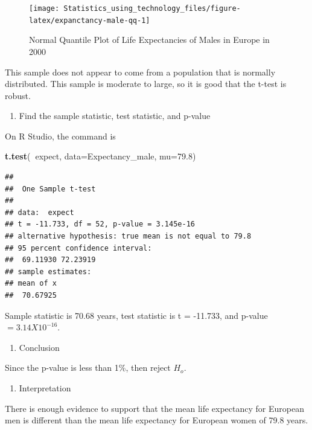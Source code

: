 \documentclass[
]{book}
\newenvironment{Shaded}{\begin{snugshade}}{\end{snugshade}}
\newcommand{\DataTypeTok}[1]{\textcolor[rgb]{0.13,0.29,0.53}{#1}}
\newcommand{\FloatTok}[1]{\textcolor[rgb]{0.00,0.00,0.81}{#1}}
\newcommand{\KeywordTok}[1]{\textcolor[rgb]{0.13,0.29,0.53}{\textbf{#1}}}
\newcommand{\NormalTok}[1]{#1}
\newcommand{\OperatorTok}[1]{\textcolor[rgb]{0.81,0.36,0.00}{\textbf{#1}}}
\providecommand{\tightlist}{%
  \setlength{\itemsep}{0pt}\setlength{\parskip}{0pt}}
\begin{document}
\begin{figure}
\texttt{[image: Statistics\_using\_technology\_files/figure-latex/expanctancy-male-qq-1]} \caption{Normal Quantile Plot of Life Expectancies of Males in Europe in 2000}\label{fig:expanctancy-male-qq}
\end{figure}

This sample does not appear to come from a population that is normally distributed. This sample is moderate to large, so it is good that the t-test is robust.

\begin{enumerate}
\def\labelenumi{\arabic{enumi}.}
\setcounter{enumi}{3}
\tightlist
\item
  Find the sample statistic, test statistic, and p-value
\end{enumerate}

On R Studio, the command is

\begin{Shaded}
\begin{Highlighting}[]
\KeywordTok{t.test}\NormalTok{(}\OperatorTok{~}\NormalTok{expect, }\DataTypeTok{data=}\NormalTok{Expectancy_male, }\DataTypeTok{mu=}\FloatTok{79.8}\NormalTok{)}
\end{Highlighting}
\end{Shaded}

\begin{verbatim}
## 
##  One Sample t-test
## 
## data:  expect
## t = -11.733, df = 52, p-value = 3.145e-16
## alternative hypothesis: true mean is not equal to 79.8
## 95 percent confidence interval:
##  69.11930 72.23919
## sample estimates:
## mean of x 
##  70.67925
\end{verbatim}

Sample statistic is 70.68 years, test statistic is t = -11.733, and p-value \(=3.14X10^{-16}\).

\begin{enumerate}
\def\labelenumi{\arabic{enumi}.}
\setcounter{enumi}{4}
\tightlist
\item
  Conclusion
\end{enumerate}

Since the p-value is less than 1\%, then reject \(H_o\).

\begin{enumerate}
\def\labelenumi{\arabic{enumi}.}
\setcounter{enumi}{5}
\tightlist
\item
  Interpretation
\end{enumerate}

There is enough evidence to support that the mean life expectancy for European men is different than the mean life expectancy for European women of 79.8 years.
\end{document}
